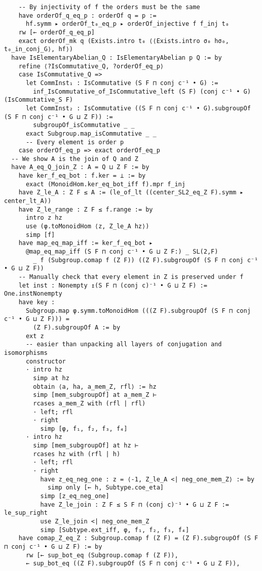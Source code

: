 \begin{tiny}
\begin{verbatim}
    -- By injectivity of f the orders must be the same
    have orderOf_q_eq_p : orderOf q = p :=
      hf.symm ▸ orderOf_t₀_eq_p ▸ orderOf_injective f f_inj t₀
    rw [← orderOf_q_eq_p]
    exact orderOf_mk q (Exists.intro t₀ ⟨⟨Exists.intro σ₀ hσ₀, t₀_in_conj_G⟩, hf⟩)
  have IsElementaryAbelian_Q : IsElementaryAbelian p Q := by
    refine ⟨?IsCommutative_Q, ?orderOf_eq_p⟩
    case IsCommutative_Q =>
      let CommInst₁ : IsCommutative (S F ⊓ conj c⁻¹ • G) :=
        inf_IsCommutative_of_IsCommutative_left (S F) (conj c⁻¹ • G) (IsCommutative_S F)
      let CommInst₂ : IsCommutative ((S F ⊓ conj c⁻¹ • G).subgroupOf (S F ⊓ conj c⁻¹ • G ⊔ Z F)) :=
        subgroupOf_isCommutative _ _
      exact Subgroup.map_isCommutative _ _
      -- Every element is order p
    case orderOf_eq_p => exact orderOf_eq_p
  -- We show A is the join of Q and Z
  have A_eq_Q_join_Z : A = Q ⊔ Z F := by
    have ker_f_eq_bot : f.ker = ⊥ := by
      exact (MonoidHom.ker_eq_bot_iff f).mpr f_inj
    have Z_le_A : Z F ≤ A := (le_of_lt ((center_SL2_eq_Z F).symm ▸ center_lt_A))
    have Z_le_range : Z F ≤ f.range := by
      intro z hz
      use (φ.toMonoidHom ⟨z, Z_le_A hz⟩)
      simp [f]
    have map_eq_map_iff := ker_f_eq_bot ▸
      @map_eq_map_iff (S F ⊓ conj c⁻¹ • G ⊔ Z F:) _ SL(2,F)
        _ f (Subgroup.comap f (Z F)) ((Z F).subgroupOf (S F ⊓ conj c⁻¹ • G ⊔ Z F))
    -- Manually check that every element in Z is preserved under f
    let inst : Nonempty ↥(S F ⊓ (conj c)⁻¹ • G ⊔ Z F) := One.instNonempty
    have key :
      Subgroup.map φ.symm.toMonoidHom (((Z F).subgroupOf (S F ⊓ conj c⁻¹ • G ⊔ Z F))) =
        (Z F).subgroupOf A := by
      ext z
      -- easier than unpacking all layers of conjugation and isomorphisms
      constructor
      · intro hz
        simp at hz
        obtain ⟨a, ha, a_mem_Z, rfl⟩ := hz
        simp [mem_subgroupOf] at a_mem_Z ⊢
        rcases a_mem_Z with (rfl | rfl)
        · left; rfl
        · right
          simp [φ, f₁, f₂, f₃, f₄]
      · intro hz
        simp [mem_subgroupOf] at hz ⊢
        rcases hz with (rfl | h)
        · left; rfl
        · right
          have z_eq_neg_one : z = ⟨-1, Z_le_A <| neg_one_mem_Z⟩ := by
            simp only [← h, Subtype.coe_eta]
          simp [z_eq_neg_one]
          have Z_le_join : Z F ≤ S F ⊓ (conj c)⁻¹ • G ⊔ Z F := le_sup_right
          use Z_le_join <| neg_one_mem_Z
          simp [Subtype.ext_iff, φ, f₁, f₂, f₃, f₄]
    have comap_Z_eq_Z : Subgroup.comap f (Z F) = (Z F).subgroupOf (S F ⊓ conj c⁻¹ • G ⊔ Z F) := by
      rw [← sup_bot_eq (Subgroup.comap f (Z F)),
      ← sup_bot_eq ((Z F).subgroupOf (S F ⊓ conj c⁻¹ • G ⊔ Z F)),

\end{verbatim}
\end{tiny}
